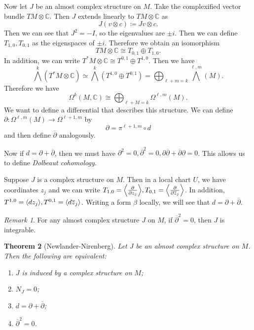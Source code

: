 \documentclass[leqno, openany]{memoir}
\DeclarePairedDelimiter{\gen}{\langle}{\rangle}
\newtheorem{thm}{Theorem}[chapter]
\theoremstyle{definition}
\theoremstyle{remark}
\newtheorem{rmk}[thm]{Remark}
\theoremstyle{plain}
\theoremstyle{definition}
\theoremstyle{remark}
\newcommand{\C}{\mathbb{C}}
\begin{document}
Now let $J$ be an almost complex structure on $M$. Take the complexified vector bundle $TM \otimes \C$. Then $J$ extends linearly to $TM \otimes \C$ as
\[ J(v \otimes c) \coloneqq Jv \otimes c.\]
Then we can see that $J^2 = -I$, so the eigenvalues are $\pm i$. Then we can define $T_{1, 0}, T_{0,1}$ as the eigenspaces of $\pm i$. Therefore we obtain an isomorphism 
\[TM \otimes \C \cong T_{0,1} \oplus T_{1,0}. \]
In addition, we can write $T^*M \otimes \C \cong T^{0,1} \oplus T^{1,0}$.
Then we have 
\[ \bigwedge^k (T^*M \otimes \C) \simeq \bigwedge^k(T^{1,0} \oplus T^{0,1}) = \bigoplus_{\ell + m = k} \bigwedge^{\ell,m}(M). \]
Therefore we have 
\[ \Omega^k(M, \C) \cong \bigoplus_{\ell + M = k} \Omega^{\ell, m}(M). \]
We want to define a differential that describes this structure. We can define $\partial: \Omega^{\ell,m}(M) \to \Omega^{\ell+1,m}$ by
\[ \partial = \pi^{\ell+1,m} \circ d \] and then define $\overline{\partial}$ analogously.

Now if $d = \partial + \overline{\partial}$, then we must have $\partial^2 = 0, \overline{\partial}^2 = 0, \partial \overline{\partial} + \overline{\partial} \partial = 0$. This allows us to define \textit{Dolbeaut cohomology}.

Suppose $J$ is a complex structure on $M$. Then in a local chart $U$, we have coordinates $z_j$ and we can write $T_{1, 0} = \gen*{\frac{\partial}{\partial z_j}}, T_{0,1} = \gen*{\frac{\partial}{\partial \overline{z}_j}}$. In addition, $T^{1,0} = \gen{dz_j}, T^{0,1} = \gen{d\overline{z}_j}$. Writing a form $\beta$ locally, we will see that $d = \partial + \overline{\partial}$.

\begin{rmk}
    For any almost complex structure $J$ on $M$, if $\overline{\partial}^2 = 0$, then $J$ is integrable.
\end{rmk}

\begin{thm}[Newlander-Nirenberg]
    Let $J$ be an almost complex structure on $M$. Then the following are equivalent:
    \begin{enumerate}
        \item $J$ is induced by a complex structure on $M$;
        \item $N_J = 0$;
        \item $d = \partial + \overline{\partial}$;
        \item $\overline{\partial}^2 = 0$.
    \end{enumerate}
\end{thm}
\end{document}
